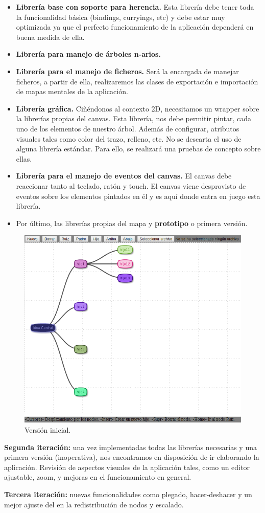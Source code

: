 \begin{itemize}
\item \textbf{Librería base con soporte para herencia.} Esta librería debe tener toda la funcionalidad básica (bindings, curryings, etc) y debe estar muy optimizada ya que el perfecto funcionamiento de la aplicación dependerá en buena medida de ella.

\item \textbf{Librería para manejo de árboles n-arios.} 

\item \textbf{Librería para el manejo de ficheros.} Será la encargada de manejar ficheros, a partir de ella, realizaremos las clases de exportación e importación de mapas mentales de la aplicación. 

\item \textbf{Librería gráfica.} Ciñéndonos al contexto 2D, necesitamos un wrapper sobre la librerías propias del canvas. Esta librería, nos debe permitir pintar, cada uno de los elementos de nuestro árbol. Además de configurar, atributos visuales tales como color del trazo, relleno, etc. No se descarta el uso de alguna librería estándar. Para ello, se realizará una pruebas de concepto sobre ellas.

\item \textbf{Librería para el manejo de eventos del canvas.} El canvas debe reaccionar tanto al teclado, ratón y touch. El canvas viene desprovisto de eventos sobre los elementos pintados en él y es aquí donde entra en juego esta librería. 

\item Por último, las librerías propias del mapa y \textbf{prototipo} o primera versión. 
\end{itemize}

\begin{figure}[tbph]
\centering
\includegraphics[width=0.5\linewidth]{imagenes/primeraVersion2}
\caption{Versión inicial.}
\label{fig:versioninicial2}
\end{figure}


\textbf{Segunda iteración:} una vez implementadas todas las librerías necesarias y una primera versión (inoperativa), nos encontramos en disposición de ir elaborando la aplicación. Revisión de aspectos visuales de la aplicación tales, como un editor ajustable, zoom, y mejoras en el funcionamiento en general. 

\textbf{Tercera iteración:} nuevas funcionalidades como plegado, hacer-deshacer y un mejor ajuste del en la redistribución de nodos y escalado.


